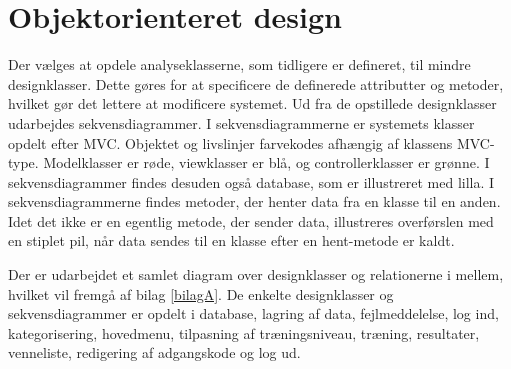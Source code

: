\section{Objektorienteret design}
Der vælges at opdele analyseklasserne, som tidligere er defineret, til mindre designklasser. Dette gøres for at specificere de definerede attributter og metoder, hvilket gør det lettere at modificere systemet. Ud fra de opstillede designklasser udarbejdes sekvensdiagrammer. I sekvensdiagrammerne er systemets klasser opdelt efter MVC. Objektet og livslinjer farvekodes afhængig af klassens MVC-type. Modelklasser er røde, viewklasser er blå, og controllerklasser er grønne. I sekvensdiagrammer findes desuden også database, som er illustreret med lilla. I sekvensdiagrammerne findes metoder, der henter data fra en klasse til en anden. Idet det ikke er en egentlig metode, der sender data, illustreres overførslen med en stiplet pil, når data sendes til en klasse efter en hent-metode er kaldt. 

Der er udarbejdet et samlet diagram over designklasser og relationerne i mellem, hvilket vil fremgå af bilag \ref{bilagA}. De enkelte designklasser og sekvensdiagrammer er opdelt i database, lagring af data, fejlmeddelelse, log ind, kategorisering, hovedmenu, tilpasning af træningsniveau, træning, resultater, venneliste, redigering af adgangskode og log ud. 
